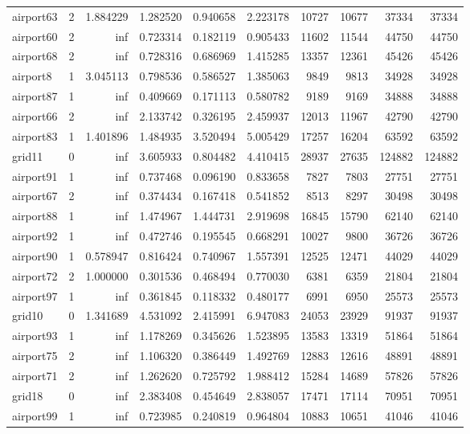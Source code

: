 \begin{longtable}{|l|r|r|r|r|r|r|r|r|r|}
airport63 & 2 & 1.884229 & 1.282520 & 0.940658 & 2.223178 & 10727 & 10677 & 37334 & 37334 \\
airport60 & 2 & inf & 0.723314 & 0.182119 & 0.905433 & 11602 & 11544 & 44750 & 44750 \\
airport68 & 2 & inf & 0.728316 & 0.686969 & 1.415285 & 13357 & 12361 & 45426 & 45426 \\
airport8 & 1 & 3.045113 & 0.798536 & 0.586527 & 1.385063 & 9849 & 9813 & 34928 & 34928 \\
airport87 & 1 & inf & 0.409669 & 0.171113 & 0.580782 & 9189 & 9169 & 34888 & 34888 \\
airport66 & 2 & inf & 2.133742 & 0.326195 & 2.459937 & 12013 & 11967 & 42790 & 42790 \\
airport83 & 1 & 1.401896 & 1.484935 & 3.520494 & 5.005429 & 17257 & 16204 & 63592 & 63592 \\
grid11 & 0 & inf & 3.605933 & 0.804482 & 4.410415 & 28937 & 27635 & 124882 & 124882 \\
airport91 & 1 & inf & 0.737468 & 0.096190 & 0.833658 & 7827 & 7803 & 27751 & 27751 \\
airport67 & 2 & inf & 0.374434 & 0.167418 & 0.541852 & 8513 & 8297 & 30498 & 30498 \\
airport88 & 1 & inf & 1.474967 & 1.444731 & 2.919698 & 16845 & 15790 & 62140 & 62140 \\
airport92 & 1 & inf & 0.472746 & 0.195545 & 0.668291 & 10027 & 9800 & 36726 & 36726 \\
airport90 & 1 & 0.578947 & 0.816424 & 0.740967 & 1.557391 & 12525 & 12471 & 44029 & 44029 \\
airport72 & 2 & 1.000000 & 0.301536 & 0.468494 & 0.770030 & 6381 & 6359 & 21804 & 21804 \\
airport97 & 1 & inf & 0.361845 & 0.118332 & 0.480177 & 6991 & 6950 & 25573 & 25573 \\
grid10 & 0 & 1.341689 & 4.531092 & 2.415991 & 6.947083 & 24053 & 23929 & 91937 & 91937 \\
airport93 & 1 & inf & 1.178269 & 0.345626 & 1.523895 & 13583 & 13319 & 51864 & 51864 \\
airport75 & 2 & inf & 1.106320 & 0.386449 & 1.492769 & 12883 & 12616 & 48891 & 48891 \\
airport71 & 2 & inf & 1.262620 & 0.725792 & 1.988412 & 15284 & 14689 & 57826 & 57826 \\
grid18 & 0 & inf & 2.383408 & 0.454649 & 2.838057 & 17471 & 17114 & 70951 & 70951 \\
airport99 & 1 & inf & 0.723985 & 0.240819 & 0.964804 & 10883 & 10651 & 41046 & 41046 \\

\end{longtable}
